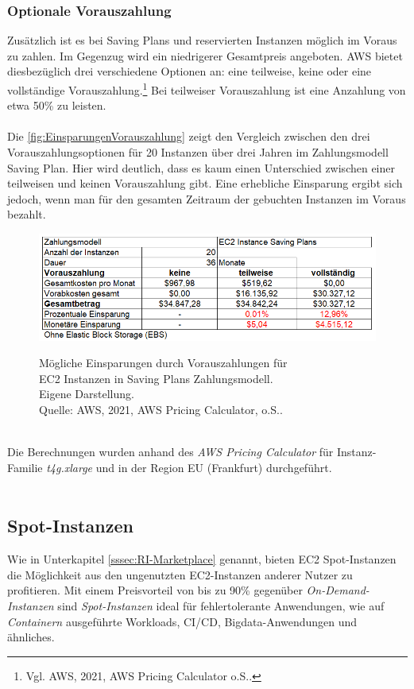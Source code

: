 \subsubsection*{Optionale Vorauszahlung}\label{sssec:Vorauszahlung}
Zusätzlich ist es bei Saving Plans und reservierten Instanzen möglich im Voraus zu zahlen. Im Gegenzug wird ein niedrigerer Gesamtpreis angeboten. AWS bietet diesbezüglich drei verschiedene Optionen an: eine teilweise, keine oder eine vollständige Vorauszahlung.\footnote{Vgl. AWS, 2021, AWS Pricing Calculator o.S.\cite{AMZ17}.} Bei teilweiser Vorauszahlung ist eine Anzahlung von etwa 50\% zu leisten.
\\\\
Die \autoref{fig:EinsparungenVorauszahlung} zeigt den Vergleich zwischen den drei Vorauszahlungsoptionen für 20 Instanzen über drei Jahren im Zahlungsmodell Saving Plan. Hier wird deutlich, dass es kaum einen Unterschied zwischen einer teilweisen und keinen Vorauszahlung gibt. Eine erhebliche Einsparung ergibt sich jedoch, wenn man für den gesamten Zeitraum der gebuchten Instanzen im Voraus bezahlt.
\begin{figure}[h!]
    \centering
    \includegraphics[scale=0.7]{sources/EinsparungenVorauszahlung}\label{fig:EinsparungenVorauszahlung}\\
    \caption[Mögliche Einsparungen durch Vorauszahlungen]{}
    \label{fig:EinsparungenVorauszahlung}
    Mögliche Einsparungen durch Vorauszahlungen für\\
    EC2 Instanzen in Saving Plans Zahlungsmodell.\\
    Eigene Darstellung. \\
    Quelle: AWS, 2021, AWS Pricing Calculator, o.S.\cite{AMZ17}.
  \end{figure}
  \\
Die Berechnungen wurden anhand des \textit{AWS Pricing Calculator} für Instanz-Familie \textit{t4g.xlarge} und in der Region EU (Frankfurt) durchgeführt.{\cite{AMZ17}} 
\\\\
\subsection{Spot-Instanzen }\label{ssec:Spot-Instances}
Wie in Unterkapitel \ref{sssec:RI-Marketplace} genannt, bieten EC2 Spot-Instanzen die Möglichkeit aus den ungenutzten EC2-Instanzen anderer Nutzer zu profitieren. Mit einem Preisvorteil von bis zu 90\% gegenüber \textit{On-Demand-Instanzen} sind \textit{Spot-Instanzen} ideal für fehlertolerante Anwendungen, wie auf \textit{Containern} ausgeführte Workloads, CI/CD, Bigdata-Anwendungen und ähnliches.

